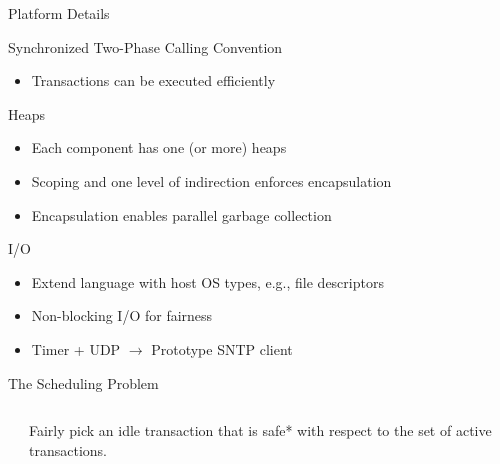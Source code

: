 \documentclass{beamer}
\begin{document}
\begin{frame}{Platform Details}

  \begin{block}{Synchronized Two-Phase Calling Convention}
    \begin{itemize}
    \item Transactions can be executed efficiently
    \end{itemize}
    \end{block}

  \begin{block}{Heaps}
    \begin{itemize}
    \item Each component has one (or more) heaps
    \item Scoping and one level of indirection enforces encapsulation
    \item Encapsulation enables parallel garbage collection
    \end{itemize}
  \end{block}

  \begin{block}{I/O}
    \begin{itemize}
    \item Extend language with host OS types, e.g., file descriptors
    \item Non-blocking I/O for fairness
    \item Timer + UDP $\to$ Prototype SNTP client
    \end{itemize}
  \end{block}
\end{frame}

\begin{frame}{The Scheduling Problem}

  \begin{columns}
    \begin{column}{.5\textwidth}
    \end{column}
    \begin{column}{.5\textwidth}
      Fairly pick an idle transaction that is {\color{green}safe*} with respect to the set of active transactions.
    \end{column}
  \end{columns}

\end{frame}
\end{document}
